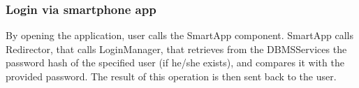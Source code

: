 \subsubsection{Login via smartphone app}
\begin{figure}[H]
	\noindent
\end{figure}
By opening the application, user calls the SmartApp component. SmartApp calls Redirector, that calls LoginManager, that retrieves from the DBMSServices the password hash of the specified user (if he/she exists), and compares it with the provided password. The result of this operation is then sent back to the user.\\
